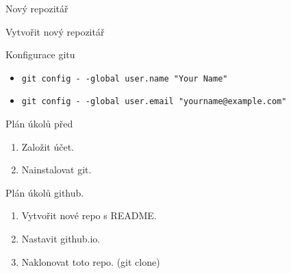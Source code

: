 \documentclass[14pt]{beamer}
\begin{document}
	\begin{frame}{Nový repozitář}
	\begin{center}
	\end{center}
	\end{frame}

	\begin{frame}{Vytvořit nový repozitář}
	\begin{center}
	\end{center}
	\end{frame}

	\begin{frame}{Konfigurace gitu}
	\begin{itemize}
		\item \texttt{git config -\,-global user.name "Your Name"}
		\item \texttt{git config -\,-global user.email "yourname@example.com"}
	\end{itemize}
	\end{frame}


	\begin{frame}{Plán úkolů před}
		\begin{enumerate}
		\item Založit účet.
		\item Nainstalovat git.
	\end{enumerate}
	\end{frame}

	\begin{frame}{Plán úkolů github.}
		\begin{enumerate}
			\item Vytvořit nové repo s README.
			\item Nastavit github.io.
			\item Naklonovat toto repo. (git clone)
		\end{enumerate}
	\end{frame}
	
\end{document}
